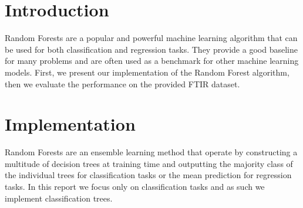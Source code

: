 \documentclass[fleqn,moreauthors,10pt]{ds_report}
\affiliation{\textsuperscript{1}\textit{ak3883@student.uni-lj.si}}
\begin{document}
\flushbottom

\maketitle

\thispagestyle{empty}


\section*{Introduction}

Random Forests are a popular and powerful machine learning algorithm that can be used for both classification and regression tasks.
They provide a good baseline for many problems and are often used as a benchmark for other machine learning models.
First, we present our implementation of the Random Forest algorithm, then we evaluate the performance on the provided FTIR dataset.




\section*{Implementation}

Random Forests are an ensemble learning method that operate by constructing a multitude of decision trees at training time and outputting the majority class of the individual trees for classification tasks or the mean prediction for regression tasks.
In this report we focus only on classification tasks and as such we implement classification trees.
\end{document}
